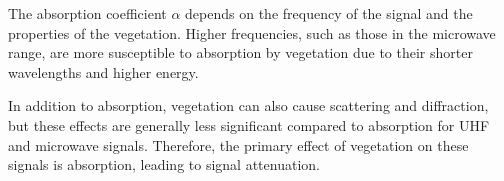 The absorption coefficient \( \alpha \) depends on the frequency of the signal and the properties of the vegetation. Higher frequencies, such as those in the microwave range, are more susceptible to absorption by vegetation due to their shorter wavelengths and higher energy.

In addition to absorption, vegetation can also cause scattering and diffraction, but these effects are generally less significant compared to absorption for UHF and microwave signals. Therefore, the primary effect of vegetation on these signals is absorption, leading to signal attenuation.

